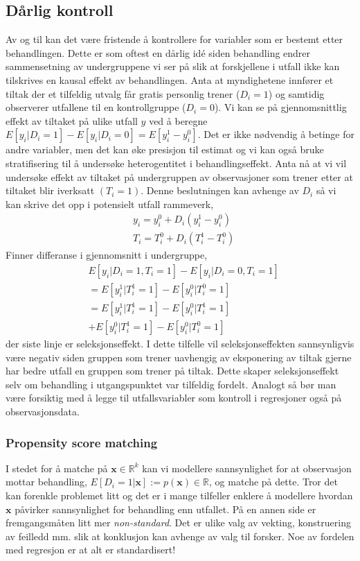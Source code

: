 \subsection{Dårlig kontroll}
Av og til kan det være fristende å kontrollere for variabler som er bestemt etter behandlingen. Dette er som oftest en dårlig idé siden behandling endrer sammensetning av undergruppene vi ser på slik at forskjellene i utfall ikke kan tilskrives en kausal effekt av behandlingen. Anta at myndighetene innfører et tiltak der et tilfeldig utvalg får gratis personlig trener ($D_i = 1$) og samtidig observerer utfallene til en kontrollgruppe ($D_i=0$). Vi kan se på gjennomsnittlig effekt av tiltaket på ulike utfall $y$ ved å beregne $E[y_i|D_i=1]-E[y_i|D_i=0]=E[y_i^1-y_i^0]$. Det er ikke nødvendig å betinge for andre variabler, men det kan øke presisjon til estimat og vi kan også bruke stratifisering til å undersøke heterogentitet i behandlingseffekt. Anta nå at vi vil undersøke effekt av tiltaket på undergruppen av observasjoner som trener etter at tiltaket blir iverksatt $(T_i = 1)$. Denne beslutningen kan avhenge av $D_i$ så vi kan skrive det opp i potensielt utfall rammeverk,
\begin{align}
&y_i = y_i^0 + D_i(y_i^1-y_i^0) \\
&T_i = T_i^0 + D_i(T_i^1-T_i^0) 
\end{align}
Finner differanse i gjennomsnitt i undergruppe,
\begin{align}
&E[y_i|D_i=1,T_i=1]-E[y_i|D_i=0,T_i=1] \\
&=E[y_i^1|T_i^1=1]-E[y_i^0|T_i^0=1] \\
&=E[y_i^1|T_i^1=1]-E[y_i^0|T_i^1=1] \\
&+E[y_i^0|T_i^1=1]-E[y_i^0|T_i^0=1]
\end{align}
der siste linje er seleksjonseffekt. I dette tilfelle vil seleksjonseffekten sannsynligvis være negativ siden gruppen som trener uavhengig av eksponering av tiltak gjerne har bedre utfall en gruppen som trener på tiltak. Dette skaper seleksjonseffekt selv om behandling i utgangspunktet var tilfeldig fordelt. Analogt så bør man være forsiktig med å legge til utfallsvariabler som kontroll i regresjoner også på observasjonsdata.
\subsubsection{Propensity score matching}
I stedet for å matche på $\mathbf{x} \in \mathbb{R}^k$ kan vi modellere sannsynlighet for at observasjon mottar behandling, $E[D_i=1|\mathbf{x}]:=p(\mathbf{x}) \in \mathbb{R}$, og matche på dette. Tror det kan forenkle problemet litt og det er i mange tilfeller enklere å modellere hvordan $\mathbf{x}$ påvirker sannsynlighet for behandling enn utfallet. På en annen side er fremgangsmåten litt mer \textit{non-standard}. Det er ulike valg av vekting, konstruering av feilledd mm. slik at konklusjon kan avhenge av valg til forsker. Noe av fordelen med regresjon er at alt er standardisert!

